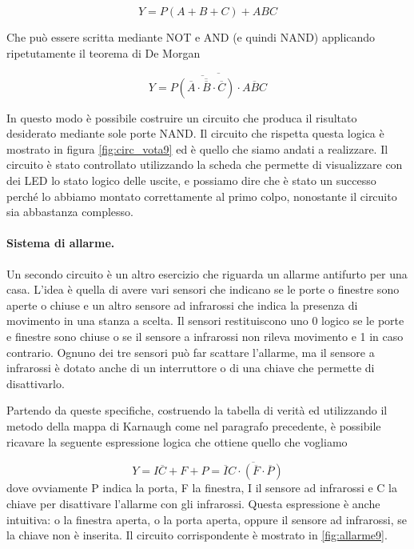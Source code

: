 \begin{equation}
	Y = P(A + B + C) + ABC
	\label{eq:logic9}
\end{equation}

Che può essere scritta mediante NOT e AND (e quindi NAND) applicando ripetutamente il
teorema di De Morgan

\begin{equation}
	Y = \overline{\overline{P(\overline{\overline{A} \cdot \overline{B} \cdot \overline{C}})} \cdot \overline{ABC}}
\end{equation}

In questo modo è possibile costruire un circuito che produca il risultato desiderato mediante
sole porte NAND. Il circuito che rispetta questa logica è mostrato in figura \ref{fig:circ_vota9}
ed è quello che siamo andati a realizzare. Il circuito è stato controllato utilizzando la
scheda che permette di visualizzare con dei LED lo stato logico delle uscite, e possiamo
dire che è stato un successo perché lo abbiamo montato correttamente al primo colpo, nonostante
il circuito sia abbastanza complesso.

\paragraph{Sistema di allarme.}

Un secondo circuito è un altro esercizio che riguarda un allarme antifurto per una casa.
L'idea è quella di avere vari sensori che indicano se le porte o finestre sono aperte o chiuse e
un altro sensore ad infrarossi che indica la presenza di movimento in una stanza a scelta.
Il sensori restituiscono uno 0 logico se le porte e finestre sono chiuse o se il sensore a infrarossi
non rileva movimento e 1 in caso contrario. Ognuno dei tre sensori può far scattare l'allarme,
ma il sensore a infrarossi è dotato anche di un interruttore o di una chiave che permette di disattivarlo.

Partendo da queste specifiche, costruendo la tabella di verità ed utilizzando il metodo della mappa
di Karnaugh come nel paragrafo precedente, è possibile ricavare la seguente espressione logica che
ottiene quello che vogliamo

\begin{equation}
	Y = I\overline{C} + F + P = \overline{\overline{I}C \cdot (\overline{F}\cdot\overline{P})}
\end{equation}
%
dove ovviamente P indica la porta, F la finestra, I il sensore ad infrarossi e C la chiave per disattivare
l'allarme con gli infrarossi. Questa espressione è anche intuitiva: o la finestra aperta, o la porta aperta,
oppure il sensore ad infrarossi, se la chiave non è inserita. Il circuito corrispondente è mostrato in \ref{fig:allarme9}.

